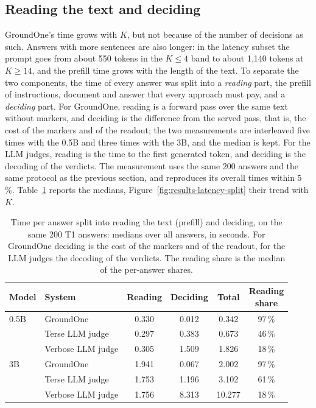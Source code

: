 \subsection{Reading the text and deciding}
\label{sec:results-latency-split}

GroundOne's time grows with $K$, but not because of the number of decisions as such. Answers with more sentences are
also longer: in the latency subset the prompt goes from about 550 tokens in the $K \leq 4$ band to about 1{,}140 tokens
at $K \geq 14$, and the prefill time grows with the length of the text. To separate the two components, the time of
every answer was split into a \emph{reading} part, the prefill of instructions, document and answer that every approach
must pay, and a \emph{deciding} part. For GroundOne, reading is a forward pass over the same text without markers, and
deciding is the difference from the served pass, that is, the cost of the markers and of the readout; the two
measurements are interleaved five times with the 0.5B and three times with the 3B, and the median is kept. For the LLM
judges, reading is the time to the first generated token, and deciding is the decoding of the verdicts. The measurement
uses the same 200 answers and the same protocol as the previous section, and reproduces its overall times within 5\,\%. Table~\ref{tab:results-latency-split} reports the medians, Figure~\ref{fig:results-latency-split} their trend
with $K$.

\begin{table}[htbp]
\centering
\caption{Time per answer split into reading the text (prefill) and deciding, on the same 200 T1 answers: medians over
all answers, in seconds. For GroundOne deciding is the cost of the markers and of the readout, for the LLM judges the
decoding of the verdicts. The reading share is the median of the per-answer shares.}
\label{tab:results-latency-split}
\small
\begin{tabular}{llcccc}
\toprule
Model & System & Reading & Deciding & Total & \makecell{Reading\\share} \\
\midrule
0.5B & GroundOne & 0.330 & 0.012 & 0.342 & 97\,\% \\
 & Terse LLM judge & 0.297 & 0.383 & 0.673 & 46\,\% \\
 & Verbose LLM judge & 0.305 & 1.509 & 1.826 & 18\,\% \\
\midrule
3B & GroundOne & 1.941 & 0.067 & 2.002 & 97\,\% \\
 & Terse LLM judge & 1.753 & 1.196 & 3.102 & 61\,\% \\
 & Verbose LLM judge & 1.756 & 8.313 & 10.277 & 18\,\% \\
\bottomrule
\end{tabular}
\end{table}


